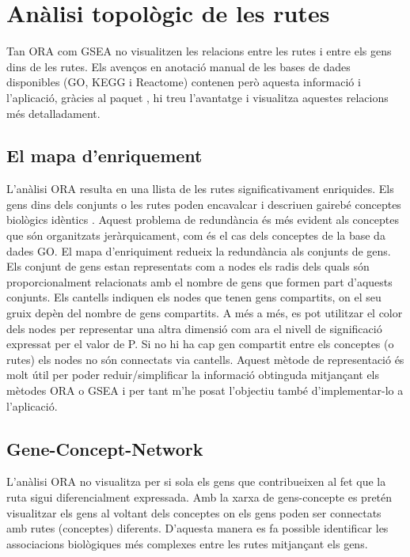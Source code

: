 \section{Anàlisi topològic de les rutes}
Tan \gls{ORA} com \gls{GSEA} no visualitzen les relacions entre les rutes i entre els gens dins de les rutes. Els avenços en anotació manual de les bases de dades disponibles (\gls{GO}, \gls{KEGG} i Reactome) contenen però aquesta informació i l'aplicació, gràcies al paquet , hi treu l'avantatge i visualitza aquestes relacions més detalladament. 

\subsection{El mapa d'enriquement}

L’anàlisi \gls{ORA} resulta en una llista de les rutes significativament enriquides. Els gens dins dels conjunts o les rutes poden encavalcar i descriuen gairebé conceptes biològics idèntics \cite{merico2010enrichment}. Aquest problema de redundància és més evident als conceptes que són organitzats jeràrquicament, com és el cas dels conceptes de la base da dades \gls{GO}. El mapa d’enriquiment redueix la redundància als conjunts de gens. Els conjunt de gens estan representats com a nodes els radis dels quals són proporcionalment relacionats amb el nombre de gens que formen part d’aquests conjunts. Els cantells indiquen els nodes que tenen gens compartits, on el seu gruix depèn del nombre de gens compartits. A més a més, es pot utilitzar el color dels nodes per representar una altra dimensió com ara el nivell de significació expressat per el valor de P. Si no hi ha cap gen compartit entre els conceptes (o rutes) els nodes no són connectats via cantells. Aquest mètode de representació és molt útil per poder reduir/simplificar la informació obtinguda mitjançant els mètodes \gls{ORA} o \gls{GSEA} i per tant m’he posat l’objectiu també d’implementar-lo a l’aplicació. 

\subsection{\gls{Gene-Concept-Network}}

L'anàlisi \gls{ORA} no visualitza per si sola els gens que contribueixen al fet que la ruta sigui diferencialment expressada. Amb la xarxa de gens-concepte es pretén visualitzar els gens al voltant dels conceptes on els gens poden ser connectats amb rutes (conceptes) diferents. D'aquesta manera es fa possible identificar les associacions biològiques més complexes entre les rutes mitjançant els gens. 

